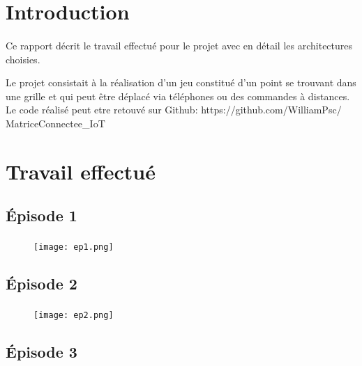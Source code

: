 \documentclass[a4paper,12pt]{report}
\begin{document}
	\pagestyle{fancy}
		\chead{}
		\lfoot{}
		\cfoot{\thepage}
		\rfoot{}
		
	\newpage\renewcommand{\contentsname}{Sommaire}
	\tableofcontents

	\newpage
	\section{Introduction}
		\paragraph*{}
		Ce rapport décrit le travail effectué pour le projet avec en détail les architectures choisies.
		
		Le projet consistait à la réalisation d’un jeu constitué d’un point se trouvant dans une grille et qui peut être déplacé via téléphones ou des commandes à distances.
Le code réalisé peut etre retouvé sur Github: https://github.com/WilliamPsc/ MatriceConnectee\_IoT
	
	\section{Travail effectué}
		\subsection{Épisode 1}
			\paragraph*{}
			
			\begin{figure}[H]
				\centering
					\texttt{[image: ep1.png]}
				\label{ep1}
			\end{figure}
		
		\subsection{Épisode 2}
			\paragraph*{}
			
			\begin{figure}[H]
				\centering
					\texttt{[image: ep2.png]}
				\label{ep1}
			\end{figure}
		
		\subsection{Épisode 3}
\end{document}
